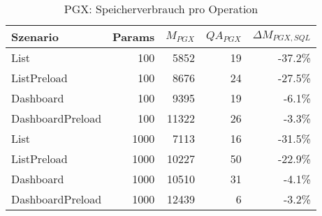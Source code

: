 
\begin{table}[ht]
\centering
\caption{PGX: Speicherverbrauch pro Operation}
\begin{tabular}{lrrrr}
\toprule
Szenario & Params & ${M_{PGX}}$ & ${QA_{PGX}}$ & ${\Delta M_{PGX,SQL}}$ \\
\midrule

	List & 100 & 5852 & 19 & -37.2\% \\
	ListPreload & 100 & 8676 & 24 & -27.5\% \\
	Dashboard & 100 & 9395 & 19 & -6.1\% \\
	DashboardPreload & 100 & 11322 & 26 & -3.3\% \\
	List & 1000 & 7113 & 16 & -31.5\% \\
	ListPreload & 1000 & 10227 & 50 & -22.9\% \\
	Dashboard & 1000 & 10510 & 31 & -4.1\% \\
	DashboardPreload & 1000 & 12439 & 6 & -3.2\% \\
\bottomrule
\end{tabular}
\label{tab:benchmark_pgx_bytesperop}
\end{table}
	